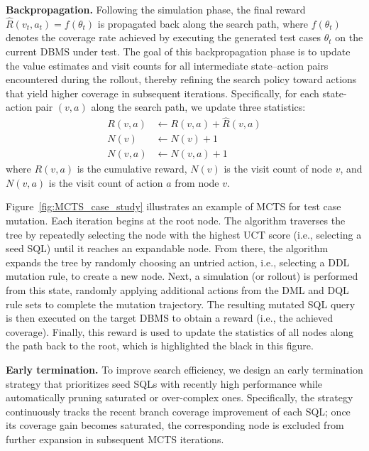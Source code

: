 \textbf{Backpropagation.} Following the simulation phase, the final reward $\widehat{R}(v_t, a_t) = f(\theta_t)$ is propagated back along the search path, where $f(\theta_t)$ denotes the coverage rate achieved by executing the generated test cases $\theta_t$ on the current DBMS under test. The goal of this backpropagation phase is to update the value estimates and visit counts for all intermediate state–action pairs encountered during the rollout, thereby refining the search policy toward actions that yield higher coverage in subsequent iterations. Specifically, for each state-action pair $(v, a)$ along the search path, we update three statistics:
\begin{align}
    R(v, a) & \leftarrow R(v, a) + \widehat{R}(v, a) \\
    N(v)      & \leftarrow N(v) + 1 \\
    N(v, a) & \leftarrow N(v, a) + 1
\end{align}
where $R(v,a)$ is the cumulative reward, $N(v)$ is the visit count of node $v$, and $N(v,a)$ is the visit count of action $a$ from node $v$.

\begin{example}
Figure~\ref{fig:MCTS_case_study} illustrates an example of MCTS for test case mutation. Each iteration begins at the root node. The algorithm traverses the tree by repeatedly selecting the node with the highest UCT score (i.e., selecting a seed SQL) until it reaches an expandable node. From there, the algorithm expands the tree by randomly choosing an untried action, i.e., selecting a DDL mutation rule, to create a new node.
Next, a simulation (or rollout) is performed from this state, randomly applying additional actions from the DML and DQL rule sets to complete the mutation trajectory. The resulting mutated SQL query is then executed on the target DBMS to obtain a reward (i.e., the achieved coverage).
Finally, this reward is used to update the statistics of all nodes along the path back to the root, which is highlighted the black in this figure.
\end{example}

\textbf{Early termination.} To improve search efficiency, we design an early termination strategy that prioritizes seed SQLs with recently high performance while automatically pruning saturated or over-complex ones. Specifically, the strategy continuously tracks the recent branch coverage improvement of each SQL; once its coverage gain becomes saturated, the corresponding node is excluded from further expansion in subsequent MCTS iterations.